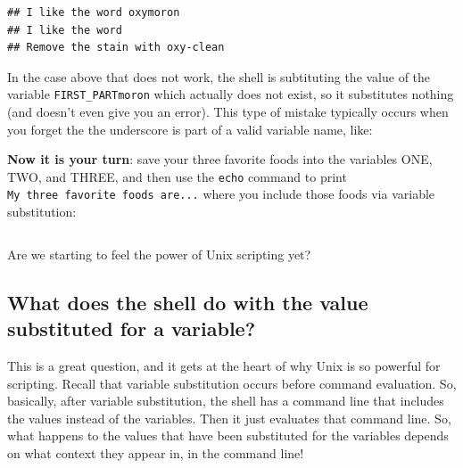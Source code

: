 \documentclass[]{krantz}
\makeatletter
\newenvironment{Shaded}{\begin{snugshade}}{\end{snugshade}}
\newcommand{\BuiltInTok}[1]{#1}
\newcommand{\NormalTok}[1]{#1}
\newcommand{\VariableTok}[1]{\textcolor[rgb]{0,0,0}{#1}}
\newenvironment{kframe}{%
\medskip{}
\setlength{\fboxsep}{.8em}
 \def\at@end@of@kframe{}%
 \ifinner\ifhmode%
  \def\at@end@of@kframe{\end{minipage}}%
  \begin{minipage}{\columnwidth}%
 \fi\fi%
 \def\FrameCommand##1{\hskip\@totalleftmargin \hskip-\fboxsep
 \colorbox{shadecolor}{##1}\hskip-\fboxsep
     \hskip-\linewidth \hskip-\@totalleftmargin \hskip\columnwidth}%
 \MakeFramed {\advance\hsize-\width
   \@totalleftmargin\z@ \linewidth\hsize
   \@setminipage}}%
 {\par\unskip\endMakeFramed%
 \at@end@of@kframe}
\renewenvironment{Shaded}{\begin{kframe}}{\end{kframe}}
\makeatother
\begin{document}
\begin{verbatim}
## I like the word oxymoron
## I like the word 
## Remove the stain with oxy-clean
\end{verbatim}

In the case above that does not work, the shell is subtituting the value
of the variable \texttt{FIRST\_PARTmoron} which actually does not exist, so
it substitutes nothing (and doesn't even give you an error). This type
of mistake typically occurs when you forget the the underscore is part of
a valid variable name, like:

\begin{Shaded}
\end{Shaded}

\textbf{Now it is your turn}: save your three favorite foods into
the variables ONE, TWO, and THREE, and then use the \texttt{echo} command
to print \texttt{My\ three\ favorite\ foods\ are...} where you include
those foods via variable substitution:

\begin{verbatim}
\end{verbatim}

Are we starting to feel the power of Unix scripting yet?

\hypertarget{what-does-the-shell-do-with-the-value-substituted-for-a-variable}{%
\subsection{What does the shell do with the value substituted for a variable?}\label{what-does-the-shell-do-with-the-value-substituted-for-a-variable}}

This is a great question, and it gets at the heart of why Unix is so powerful
for scripting. Recall that variable substitution occurs before command evaluation.
So, basically, after variable substitution, the shell has a command line that includes
the values instead of the variables. Then it just evaluates that command line. So, what
happens to the values that have been substituted for the variables depends on what context
they appear in, in the command line!
\end{document}
